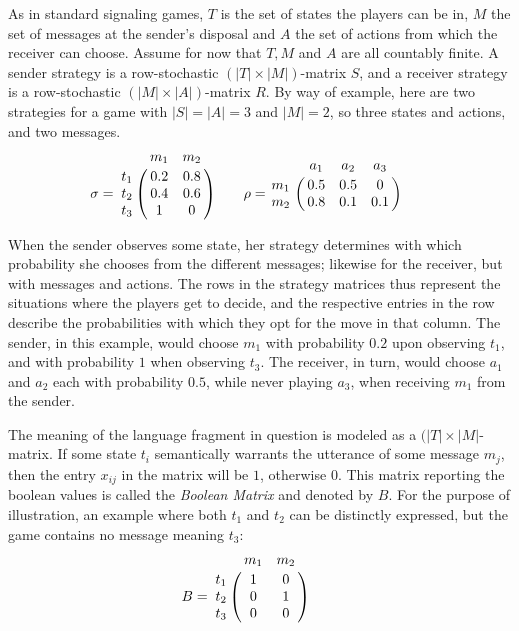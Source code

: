 \documentclass[10]{article}
\begin{document}
As in standard signaling games, $T$ is the set of states the players can be in, $M$ the set of messages at the sender's disposal and $A$ the set of actions from which the receiver can choose. Assume for now that $T,M$ and $A$ are all countably finite. A sender strategy is a row-stochastic $(|T| \times |M|)$-matrix $S$, and a receiver strategy is a row-stochastic $(|M|\times |A|)$-matrix $R$. By way of example, here are two strategies for a game with $|S|=|A|=3$ and $|M|=2$, so three states and actions, and two messages. \\
\begin{equation*}
\sigma =
    \bordermatrix{
          & m_1 & m_2    \cr
      t_1 & 0.2 & 0.8  \cr
      t_2 & 0.4 & 0.6  \cr
      t_3 & 1 & 0
    }\qquad
\rho =
    \bordermatrix{
              & a_1 & a_2 & a_3    \cr
          m_1 & 0.5 & 0.5 & 0  \cr
          m_2 & 0.8 & 0.1 & 0.1
        }\qquad
\end{equation*}

When the sender observes some state, her strategy determines with which probability she chooses from the different messages; likewise for the receiver, but with messages and actions. The rows in the strategy matrices thus represent the situations where the players get to decide, and the respective entries in the row describe the probabilities with which they opt for the move in that column. The sender, in this example, would choose $m_1$ with probability $0.2$ upon observing $t_1$, and with probability $1$ when observing $t_3$. The receiver, in turn, would choose $a_1$ and $a_2$ each with probability $0.5$, while never playing $a_3$, when receiving $m_1$ from the sender.

The meaning of the language fragment in question is modeled as a $(|T| \times |M|$-matrix. If some state $t_i$ semantically warrants the utterance of some message $m_j$, then the entry $x_{ij}$ in the matrix will be $1$, otherwise $0$. This matrix reporting the boolean values is called the \textit{Boolean Matrix} and denoted by $B$. For the purpose of illustration, an example where both $t_1$ and $t_2$ can be distinctly expressed, but the game contains no message meaning $t_3$:\\
\begin{equation*}
B =
    \bordermatrix{
              & m_1 & m_2    \cr
          t_1 & 1 & 0  \cr
          t_2 & 0 & 1  \cr
          t_3 & 0 & 0
        }\qquad
\end{equation*}
\end{document}
